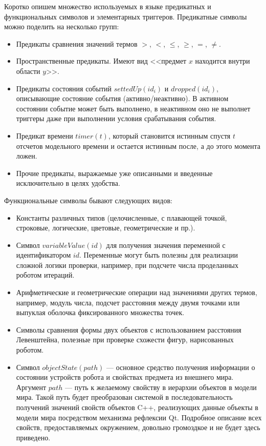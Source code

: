 \documentclass[a5paper]{article}
\begin{document}
Коротко опишем множество используемых в языке предикатных и функциональных символов и элементарных триггеров. Предикатные символы можно поделить на несколько групп:
\begin{itemize}
    \item Предикаты сравнения значений термов $>$, $<$, $\leq$, $\geq$, $=$, $\neq$.
    \item Пространственные предикаты. Имеют вид <<предмет $x$ находится внутри области $y$>>.
    \item Предикаты состояния событий $settedUp(id_i)$ и $dropped(id_i)$, описывающие состояние события 
            (активно/неактивно). В активном состоянии событие может быть выполнено, в неактивном оно не выполнет триггеры даже при выполнении условия срабатывания события.
    \item Предикат времени $timer(t)$, который становится истинным спустя $t$ отсчетов модельного времени и остается истинным после, а до этого момента ложен.
    \item Прочие предикаты, выражаемые уже описанными и введенные исключительно в целях удобства.
\end{itemize}

Функциональные символы бывают следующих видов:
\begin{itemize}
    \item Константы различных типов (целочисленные, с плавающей точкой, строковые, логические, цветовые, геометрические и пр.).
    \item Символ $variableValue(id)$ для получения значения переменной с идентификатором $id$. Переменные могут быть полезны для реализации сложной логики проверки, например, при подсчете числа проделанных роботом итераций.
    \item Арифметические и геометрические операции над значениями других термов, например, модуль числа, подсчет расстояния между двумя точками или выпуклая оболочка фиксированного множества точек.
    \item Символы сравнения формы двух объектов с использованием расстояния Левенштейна, полезные при проверке схожести фигур, нарисованных роботом.
    \item Символ $objectState(path)$ --- основное средство получения информации о состоянии устройств робота и свойствах предмета из внешнего мира. Аргумент $path$ --- путь к желаемому свойству в иерархии объектов в модели мира. Такой путь будет преобразован системой в последовательность получений значений свойств объектов C++, реализующих данные объекты в модели мира посредством механизма рефлексии Qt. Подробное описание всех свойств, предоставляемых окружением, довольно громоздкое и не будет здесь приведено.
\end{itemize}
\end{document}
